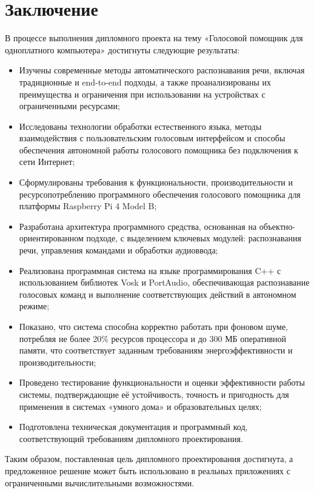 \section*{Заключение}

В процессе выполнения дипломного проекта на тему «Голосовой помощник для одноплатного компьютера» достигнуты следующие результаты:

\begin{itemize}
	\item Изучены современные методы автоматического распознавания речи, включая традиционные и end-to-end подходы, а также проанализированы их преимущества и ограничения при использовании на устройствах с ограниченными ресурсами;
	\item Исследованы технологии обработки естественного языка, методы взаимодействия с пользовательским голосовым интерфейсом и способы обеспечения автономной работы голосового помощника без подключения к сети Интернет;
	\item Сформулированы требования к функциональности, производительности и ресурсопотреблению программного обеспечения голосового помощника для платформы Raspberry Pi 4 Model B;
	\item Разработана архитектура программного средства, основанная на объектно-ориентированном подходе, с выделением ключевых модулей: распознавания речи, управления командами и обработки аудиоввода;
	\item Реализована программная система на языке программирования C++ с использованием библиотек Vosk и PortAudio, обеспечивающая распознавание голосовых команд и выполнение соответствующих действий в автономном режиме;
	\item Показано, что система способна корректно работать при фоновом шуме, потребляя не более 20\% ресурсов процессора и до 300 МБ оперативной памяти, что соответствует заданным требованиям энергоэффективности и производительности;
	\item Проведено тестирование функциональности и оценки эффективности работы системы, подтверждающие её устойчивость, точность и пригодность для применения в системах «умного дома» и образовательных целях;
	\item Подготовлена техническая документация и программный код, соответствующий требованиям дипломного проектирования.
\end{itemize}

Таким образом, поставленная цель дипломного проектирования достигнута, а предложенное решение может быть использовано в реальных приложениях с ограниченными вычислительными возможностями.



